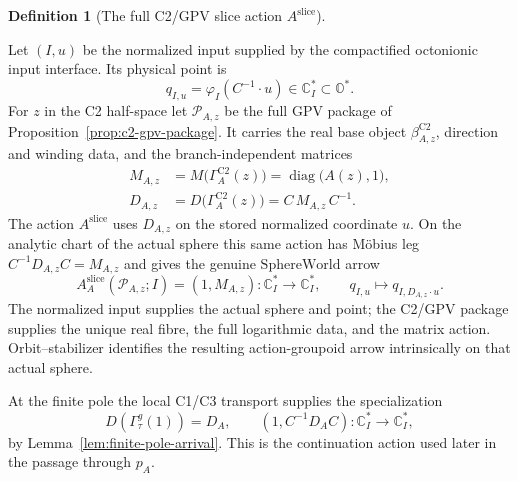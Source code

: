 \documentclass[11pt]{article}
\newcommand{\OO}{\mathbb{O}}
\newcommand{\CC}{\mathbb{C}}
\providecommand{\SphereWorld}{\mathrm{SphereWorld}}
\providecommand{\lean}[1]{}
\providecommand{\uses}[1]{}
\theoremstyle{plain}
\theoremstyle{definition}
\newtheorem{definition}[theorem]{Definition}
\theoremstyle{remark}
\begin{document}
\begin{definition}[The full C2/GPV slice action
$A^{\mathrm{slice}}$]\label{def:aslice}
\lean{ASection.sliceMatrixAction, ASection.sliceMatrixActionArrow,
ASection.sliceExponentialEnd,
ASection.C2GpvPackage.realPreimage,
ASection.C2GpvPackage.canonicalLift_eq_primePower,
ASection.C2GpvPackage.branch_realPreimage_eq,
ASection.C2GpvPackage.branch_diskAction_eq,
ASection.C2GpvPackage.sliceActionHom,
ASection.C2GpvPackage.sliceActionHom_eq_map,
ASection.C2GpvPackage.sliceActionHom_realize,
ASection.C2GpvPackage.sliceActionHom_natural_dir}
\uses{def:cayley-disk, prop:c2-gpv-package, lem:gpv-value-action,
lem:orbit-stab}
Let $(I,u)$ be the normalized input supplied by the compactified
octonionic input interface. Its physical point is
\[
 q_{I,u}=\varphi_I\!\left(C^{-1}\mathbin{\cdot}u\right)
       \in\CC_I^{*}\subset\OO^{*}.
\]
For $z$ in the C2 half-space let $\mathcal P_{A,z}$ be the full GPV package
of Proposition~\ref{prop:c2-gpv-package}. It carries the real base object
$\beta^{\mathrm{C2}}_{A,z}$, direction and winding data, and the
branch-independent matrices
\[
\begin{aligned}
 M_{A,z}
   &=M\bigl(\Gamma_A^{\mathrm{C2}}(z)\bigr)
     =\operatorname{diag}\bigl(A(z),1\bigr),\\
 D_{A,z}
   &=D\bigl(\Gamma_A^{\mathrm{C2}}(z)\bigr)
     =C\,M_{A,z}\,C^{-1}.
\end{aligned}
\]
The action $A^{\mathrm{slice}}$ uses $D_{A,z}$ on the stored normalized
coordinate $u$. On the analytic chart of the actual sphere this same action
has Möbius leg $C^{-1}D_{A,z}C=M_{A,z}$ and gives the genuine
$\SphereWorld$ arrow
\[
 A^{\mathrm{slice}}_A(\mathcal P_{A,z};I)
   =(1,M_{A,z}):\CC_I^{*}\longrightarrow\CC_I^{*},
 \qquad
 q_{I,u}\longmapsto q_{I,D_{A,z}\cdot u}.
                                                        \tag{Slice}\label{eq:full-c2-slice-action}
\]
The normalized input supplies the actual sphere and point; the C2/GPV
package supplies the unique real fibre, the full logarithmic data, and the
matrix action. Orbit--stabilizer identifies the resulting action-groupoid
arrow intrinsically on that actual sphere.

At the finite pole the local C1/C3 transport supplies the specialization
\[
 D(\Gamma^g_\tau(1))=D_A,\qquad
 (1,C^{-1}D_A C):\CC_I^*\longrightarrow\CC_I^*,
\]
by Lemma~\ref{lem:finite-pole-arrival}. This is the continuation action used
later in the passage through $p_A$.
\end{definition}
\end{document}
